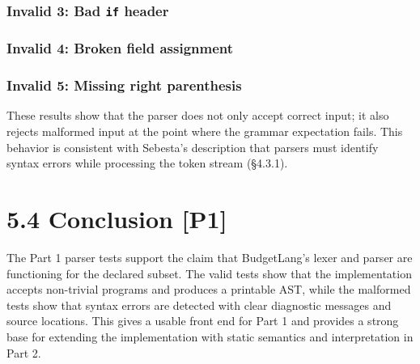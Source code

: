 \documentclass[11pt]{article}
\begin{document}
\subsubsection*{Invalid 3: Bad \texttt{if} header}


\subsubsection*{Invalid 4: Broken field assignment}


\subsubsection*{Invalid 5: Missing right parenthesis}


These results show that the parser does not only accept correct input; it also rejects malformed input at the point where the grammar expectation fails. This behavior is consistent with Sebesta's description that parsers must identify syntax errors while processing the token stream (\S4.3.1).

\section*{5.4 Conclusion [P1]}
The Part 1 parser tests support the claim that BudgetLang's lexer and parser are functioning for the declared subset. The valid tests show that the implementation accepts non-trivial programs and produces a printable AST, while the malformed tests show that syntax errors are detected with clear diagnostic messages and source locations. This gives a usable front end for Part 1 and provides a strong base for extending the implementation with static semantics and interpretation in Part 2.
\end{document}
